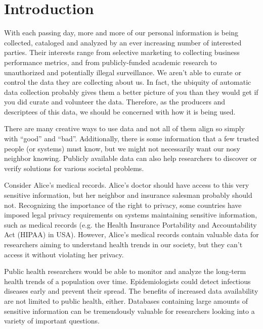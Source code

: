 \documentclass[12pt]{report}
\begin{document}
\clearpage
\tableofcontents
\clearpage
\listoffigures
\clearpage

\chapter{Introduction}\label{sec:introduction}

With each passing day, more and more of our personal information is being collected, cataloged and analyzed by an ever increasing number of interested parties.
Their interests range from selective marketing to collecting business performance metrics, and from publicly-funded academic research to unauthorized and potentially illegal surveillance.
We aren't able to curate or control the data they are collecting about us.
In fact, the ubiquity of automatic data collection probably gives them a better picture of you than they would get if you did curate and volunteer the data.
Therefore, as the producers and descriptees of this data, we should be concerned with how it is being used.

There are many creative ways to use data and not all of them align so simply with ``good'' and ``bad''.
Additionally, there is some information that a few trusted people (or systems) must know, but we might not necessarily want our nosy neighbor knowing.
Publicly available data can also help researchers to discover or verify solutions for various societal problems.

Consider Alice's medical records.
Alice's doctor should have access to this very sensitive information, but her neighbor and insurance salesman probably should not.
Recognizing the importance of the right to privacy, some countries have imposed legal privacy requirements on systems maintaining sensitive information, such as medical records (e.g. the Health Insurance Portability and Accountability Act (HIPAA) in USA).
However, Alice's medical records contain valuable data for researchers aiming to understand health trends in our society, but they can't access it without violating her privacy.

Public health researchers would be able to monitor and analyze the long-term health trends of a population over time.
Epidemiologists could detect infectious diseases early and prevent their spread.
The benefits of increased data availability are not limited to public health, either.
Databases containing large amounts of sensitive information can be tremendously valuable for researchers looking into a variety of important questions.
\end{document}
